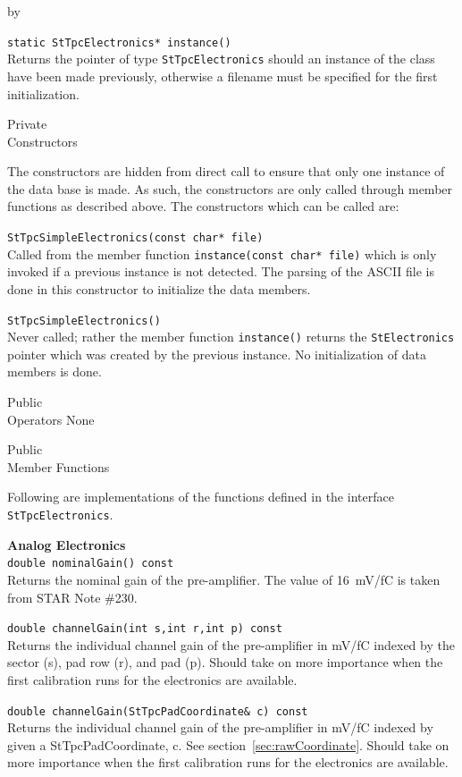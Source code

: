 \documentclass[twoside]{article}
\newcommand{\comp}[1]{\texttt{#1}}%
\newcommand{\entrylabel}[1]{\mbox{\textbf{{#1}}}\hfil}%
\newenvironment{entry}
{\begin{list}{}%
    {\renewcommand{\makelabel}{\entrylabel}%
     \setlength{\labelwidth}{90pt}%
     \setlength{\leftmargin}{\labelwidth}
     \advance\leftmargin by \labelsep%
      }%
    }%
  {\end{list}}
\newcommand{\Entrylabel}[1]%
{\raisebox{0pt}[1ex][0pt]{\makebox[\labelwidth][l]%
    {\parbox[t]{\labelwidth}{\hspace{0pt}\textbf{{#1}}}}}}
\newenvironment{Entry}%
{\renewcommand{\entrylabel}{\Entrylabel}\begin{entry}}%
  {\end{entry}}
\begin{document}
\begin{Entry}
   \verb+static StTpcElectronics* instance()+\\
   Returns the pointer of type \comp{StTpcElectronics} should an instance
   of the class have been made previously, otherwise a filename
   must be specified for the first initialization.

\item[Private \\ Constructors]

   The constructors are hidden from direct call to ensure that
   only one instance of the data base is made.  As such, the
   constructors are only called through member functions
   as described above.  The constructors which can be called are:

   \verb+StTpcSimpleElectronics(const char* file)+\\
   Called from the member function \texttt{instance(const char* file)}
   which is only invoked if a previous instance is not detected.
   The parsing of the ASCII file is done in this constructor to
   initialize the data members.

   \verb+StTpcSimpleElectronics()+\\
   Never called; rather the member function \texttt{instance()}
   returns the \comp{StElectronics} pointer which was created by
   the previous instance.  No initialization of data members is done.

\item[Public \\ Operators]
   None

\item[Public \\ Member Functions]

  Following are implementations of the functions defined in
  the interface \comp{StTpcElectronics}.

  {\bf Analog Electronics \\} 
  \verb+double nominalGain() const+\\
  Returns the nominal gain of the pre-amplifier.  The
  value of 16~mV/fC is taken from STAR Note \#230.

  \verb+double channelGain(int s,int r,int p) const+\\
  Returns the individual channel gain of the pre-amplifier in
  mV/fC indexed  by the sector (s), pad row (r), and pad (p).
  Should take on more importance when the first calibration runs
  for the electronics are available.

  \verb+double channelGain(StTpcPadCoordinate& c) const+\\
  Returns the individual channel gain of the pre-amplifier in
  mV/fC indexed by given a StTpcPadCoordinate, c.  
  See section~\ref{sec:rawCoordinate}.
  Should take on more importance when the first calibration runs
  for the electronics are available.


\end{Entry}
\end{document}
